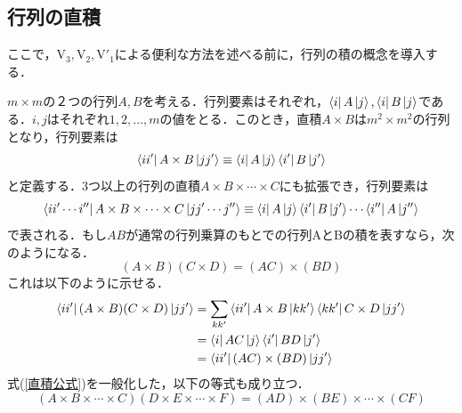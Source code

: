 \documentclass[a4paper,11pt]{jsreport}
\begin{document}
\subsection{行列の直積}
ここで，$\mathrm{V}_3, \mathrm{V}_2, \mathrm{V}'_1$による便利な方法を述べる前に，行列の積の概念を導入する．\par
$m \times m$の２つの行列$A, B$を考える．行列要素はそれぞれ，$\bra{i}A\ket{j}, \bra{i}B\ket{j}$である．$i, j$はそれぞれ$1, 2, \dots, m$の値をとる．このとき，直積$A \times B$は$m^2 \times m^2$の行列となり，行列要素は
\begin{equation}
  \bra{ii'}A \times B\ket{jj'}
  \equiv \bra{i} A \ket{j} \bra{i'} B \ket{j'}
\end{equation}
と定義する．3つ以上の行列の直積$A \times B \times \cdots \times C$にも拡張でき，行列要素は
\begin{equation}
  \bra{ii' \cdots i''} A \times B \times \cdots \times C \ket{jj' \cdots j''}
  \equiv \bra{i}A\ket{j} \bra{i'}B\ket{j'} \cdots \bra{i''}A\ket{j''}
\end{equation}
で表される．もし$AB$が通常の行列乗算のもとでの行列AとBの積を表すなら，次のようになる．
\begin{equation}
  (A \times B)(C \times D) = (AC) \times (BD)
\end{equation}
これは以下のように示せる．
\begin{align*}
  \bra{ii'} (A \times B)(C \times D) \ket{jj'}
   & = \sum_{kk'} \bra{ii'} A \times B \ket{kk'} \bra{kk'} C \times D \ket{jj'} \\
   & = \bra{i} AC \ket{j} \bra{i'} BD \ket{j'}                                  \\
   & = \bra{ii'} (AC) \times (BD) \ket{jj'}
  \label{直積公式}
\end{align*}
式(\ref{直積公式})を一般化した，以下の等式も成り立つ．
\begin{equation}
  (A \times B \times \cdots \times C) (D \times E \times \cdots \times F)
  = (AD) \times (BE) \times \cdots \times (CF)
\end{equation}
\end{document}
